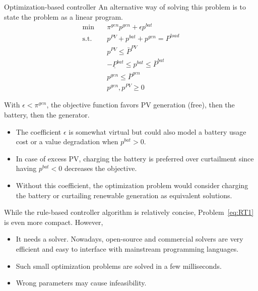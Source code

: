 \begin{frame}[allowframebreaks]{Optimization-based controller}
An alternative way of solving this problem is to state the problem as a linear program. 
\begin{subequations}
	\label{eq:RT1}
    \begin{align}
    \min        \quad  & \pi^{gen} p^{gen}  + \epsilon p^{bat}\\
    \text{s.t.} \quad  & p^{PV}+p^{bat}+p^{gen} = P^{load} \\
                    & p^{PV} \leq \bar{P}^{PV} \\
                    & -\underline{P}^{bat} \leq p^{bat} \leq \bar{P}^{bat} \\
                    & p^{gen} \leq \bar{P}^{gen}\\
                    & p^{gen}, p^{PV} \geq 0
    \end{align}
\end{subequations}

With $\epsilon < \pi^{gen}$, the objective function favors PV generation (free), then the battery, then the generator. 

\begin{itemize}
    \item The coefficient $\epsilon$ is somewhat virtual but could also model a battery usage cost or a value degradation when $p^{bat} > 0$.
    \item In case of excess PV, charging the battery is preferred over curtailment since having $p^{bat} < 0$ decreases the objective. 
    \item Without this coefficient, the optimization problem would consider charging the battery or curtailing renewable generation as equivalent solutions.
\end{itemize}

While the rule-based controller algorithm is relatively concise, Problem~\eqref{eq:RT1} is even more compact. 
However,
\begin{itemize}
    \item It needs a solver. Nowadays, open-source and commercial solvers are very efficient and easy to interface with mainstream programming languages. 
    \item Such small optimization problems are solved in a few milliseconds. 
    \item Wrong parameters may cause infeasibility. 
\end{itemize}
\end{frame}


